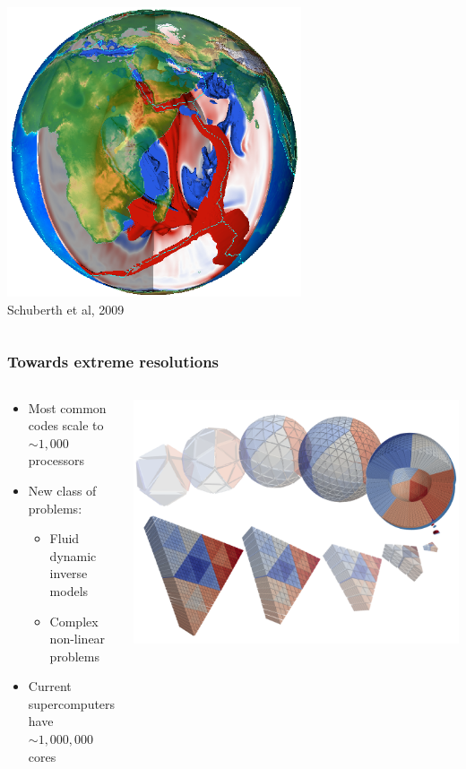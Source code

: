 \documentclass[t,compress=false,usepdftitle=false]{beamer}
\begin{document}
\begin{frame}
\begin{columns}
\vspace{-6mm}
\flushright\includegraphics[width=0.65\textwidth]{MantlePicTerra.png}\\
\scriptsize{Schuberth et al, 2009}\\
\end{columns}
\end{frame}
\begin{frame}\frametitle{Towards extreme resolutions}
\begin{columns}
\vspace*{5mm}
\begin{myColorBox}{.9}{}\color{linkcolor}
\centering
\begin{itemize}
 \item Most common codes scale to $\sim 1,000$ processors
 \item New class of problems:
 \begin{itemize}
  \item Fluid dynamic inverse models
  \item Complex non-linear problems
 \end{itemize}
 \item Current supercomputers have $\sim 1,000,000$ cores
\end{itemize}
\end{myColorBox}
\centering\includegraphics[width=\textwidth]{earth-collage.png}\\
\end{columns}
\end{frame}
\end{document}
